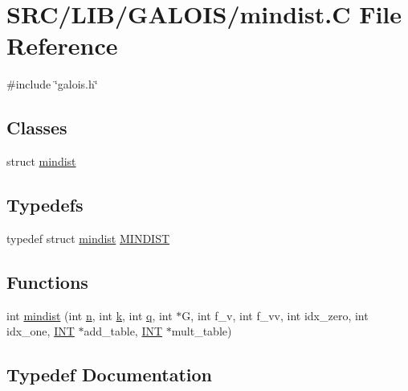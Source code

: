 \hypertarget{mindist_8_c}{}\section{S\+R\+C/\+L\+I\+B/\+G\+A\+L\+O\+I\+S/mindist.C File Reference}
\label{mindist_8_c}
{\ttfamily \#include \char`\"{}galois.\+h\char`\"{}}\newline
\subsection*{Classes}
\begin{DoxyCompactItemize}
\item 
struct \mbox{\hyperlink{structmindist}{mindist}}
\end{DoxyCompactItemize}
\subsection*{Typedefs}
\begin{DoxyCompactItemize}
\item 
typedef struct \mbox{\hyperlink{structmindist}{mindist}} \mbox{\hyperlink{mindist_8_c_a4bd5b989fb66bfdc88d228601d74aee7}{M\+I\+N\+D\+I\+ST}}
\end{DoxyCompactItemize}
\subsection*{Functions}
\begin{DoxyCompactItemize}
\item 
int \mbox{\hyperlink{mindist_8_c_afcf4627b68150e9a146e7cacdabb2b26}{mindist}} (int \mbox{\hyperlink{simeon_8_c_a7f2cd26777ce0ff3fdaf8d02aacbddfb}{n}}, int \mbox{\hyperlink{simeon_8_c_a43fa990200c3ddd47c35f151bd4d66bf}{k}}, int \mbox{\hyperlink{simeon_8_c_a92cbb483a3b27ae1a0dbfcb125ce216f}{q}}, int $\ast$G, int f\+\_\+v, int f\+\_\+vv, int idx\+\_\+zero, int idx\+\_\+one, \mbox{\hyperlink{galois_8h_a09fddde158a3a20bd2dcadb609de11dc}{I\+NT}} $\ast$add\+\_\+table, \mbox{\hyperlink{galois_8h_a09fddde158a3a20bd2dcadb609de11dc}{I\+NT}} $\ast$mult\+\_\+table)
\end{DoxyCompactItemize}


\subsection{Typedef Documentation}
\mbox{\label{mindist_8_c_a4bd5b989fb66bfdc88d228601d74aee7}} 
